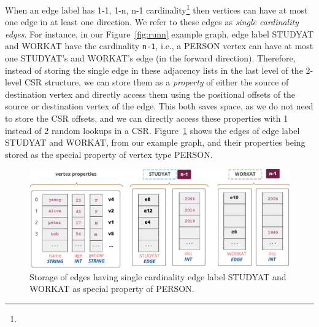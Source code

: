 When an edge label has 1-1, 1-n, n-1  cardinality\footnote{} then vertices can have at most one edge in at least one direction. We refer to these edges as {\em single cardinality edges}. For instance, in our Figure~\ref{fig:runn} example graph, edge label STUDYAT and WORKAT have the cardinality \texttt{n-1}, i.e., a PERSON vertex can have at most one STUDYAT's and WORKAT's edge (in the forward direction). Therefore, instead of storing the single edge in these adjacency lists in the last level of the 2-level CSR structure, we can store them as a \emph{property} of either the source of destination vertex and directly access them using the positional offsets of the source or destination vertex of the edge. This both saves space, as we do not need to store the CSR offsets, and we can directly access these properties with 1 instead of 2 random lookups in a CSR. Figure~\ref{fig:single-cardinality-cols} shows the edges of edge label STUDYAT and WORKAT, from our example graph, and their properties being stored as the special property of vertex type PERSON.



\begin{figure}
	\hfill\includegraphics[scale=0.78]{img/single-cardinality-cols}\hspace*{\fill}
	\captionsetup{justification=centering}
	\caption{Storage of edges having single cardinality edge label STUDYAT and WORKAT as special property of PERSON.}
	\label{fig:single-cardinality-cols}
\end{figure} 


